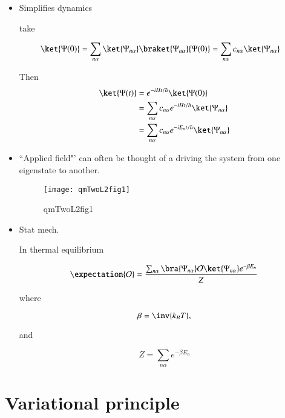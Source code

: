 \begin{itemize}
\item Simplifies dynamics

take

\begin{align*}
\ket{\Psi(0)}
= \sum_{n\alpha}
\ket{\Psi_{n \alpha}}
\braket{\Psi_{n \alpha}}{\Psi(0)}
&
= \sum_{n\alpha} c_{n \alpha} \ket{\Psi_{n \alpha}}
\end{align*}

Then
\begin{align*}
\ket{\Psi(t)}
&=
e^{-i H t/\hbar}
\ket{\Psi(0)} \\
&=
\sum_{n\alpha} c_{n \alpha}
e^{-i H t/\hbar}
\ket{\Psi_{n \alpha}}  \\
&=
\sum_{n\alpha} c_{n \alpha}
e^{-i E_n t/\hbar}
\ket{\Psi_{n \alpha}}
\end{align*}

\item ``Applied  field"' can often be thought of a driving the system from one eigenstate to another.

\begin{figure}[htp]
\centering
\texttt{[image: qmTwoL2fig1]}
\caption{qmTwoL2fig1}\label{fig:qmTwoL2fig1}
\end{figure}

\item Stat mech.

In thermal equilibrium

\begin{equation}\label{eqn:qmTwoL2:30}
\expectation{\mathcal{O}} =
\frac{\sum_{n \alpha} \bra{\Psi_{n\alpha}} \mathcal{O} \ket{\Psi_{n \alpha}}  e^{-\beta E_n}}{
Z
}
\end{equation}

where

\begin{equation}\label{eqn:qmTwoL2:50}
\beta = \inv{k_B T},
\end{equation}

and

\begin{equation}\label{eqn:qmTwoL2:70}
Z = \sum_{n \alpha} e^{-\beta E_n}
\end{equation}
\end{itemize}

\section{Variational principle}

